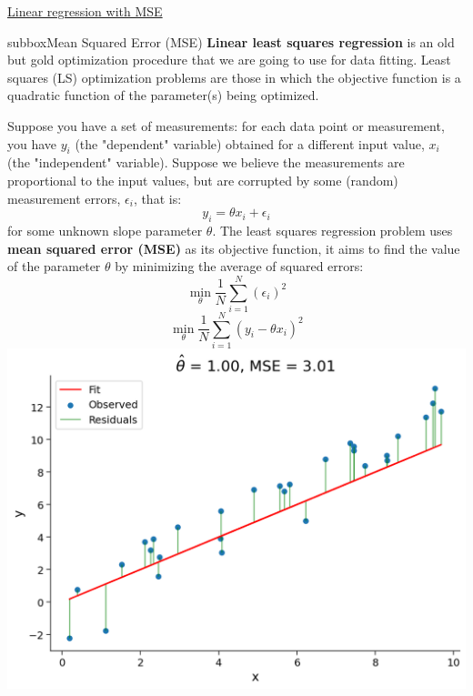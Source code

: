 \begin{textbox}{\href{https://compneuro.neuromatch.io/tutorials/W1D2_ModelFitting/chapter_title.html}{Linear regression with MSE }}
\begin{subbox}{subbox}{Mean Squared Error (MSE)}
\scriptsize
\textbf{Linear least squares regression} is an old but gold  optimization procedure that we are going to use for data fitting. Least squares (LS) optimization problems are those in which the objective function is a quadratic function of the
parameter(s) being optimized.

Suppose you have a set of measurements: for each data point or measurement, you have $y_{i}$ (the "dependent" variable) obtained for a different input value, $x_{i}$ (the "independent" variable).  Suppose we believe the measurements are proportional to the input values, but are corrupted by some (random) measurement errors, $\epsilon_{i}$, that is:
\begin{equation}
y_{i}= \theta x_{i}+\epsilon_{i}
\end{equation}
for some unknown slope parameter $\theta.$ The least squares regression problem uses \textbf{mean squared error (MSE)} as its objective function, it aims to find the value of the parameter $\theta$ by minimizing the average of squared errors:
\begin{equation}
\min _{\theta} \frac{1}{N}\sum_{i=1}^{N}\left(\epsilon_{i}\right)^{2}
\end{equation}
\begin{equation}
\min _{\theta} \frac{1}{N}\sum_{i=1}^{N}\left(y_{i}-\theta x_{i}\right)^{2}
\end{equation}
\centering
\includegraphics[scale=0.15]{Figures/ModelFitting/MFFigure1.png}

\end{subbox}
\end{textbox}
